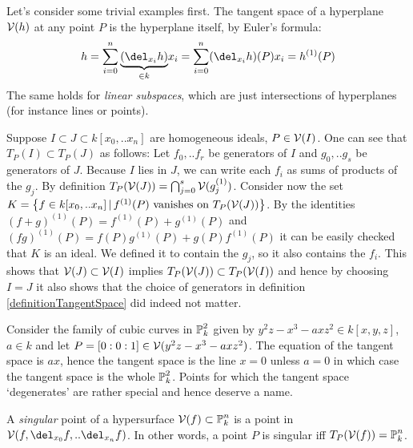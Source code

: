 \begin{example} \label{exampleTangentPlaneOfLinearSubsets}
Let's consider some trivial examples first.
The tangent space of a hyperplane $\operatorname{\mathcal V}(h)$ at any point $P$ is the hyperplane itself, by Euler's formula:
\begin{equation}
h = \sum_{i=0}^n \underset{\in k}{\underbrace{(\del_{x_i}h)}}x_i = \sum_{i=0}^n (\del_{x_i}h)(P) x_i = h^{(1)}(P)
\end{equation}
The same holds for \emph{linear subspaces}, which are just intersections of hyperplanes (for instance lines or points).
\end{example}

\begin{example}
Suppose $I \subset J \subset k[x_0,..x_n]$ are homogeneous ideals, $P \in \operatorname{\mathcal V}(I)$.
One can see that $T_P(I) \subset T_P(J)$ as follows: Let $f_0,..f_r$ be generators of $I$ and $g_0,..g_s$ be generators of $J$.
Because $I$ lies in $J$, we can write each $f_i$ as sums of products of the $g_j$.
By definition $T_P(\operatorname{\mathcal V}(J)) = \bigcap_{j=0}^s \operatorname{\mathcal V}(g_j^{(1)})$.
Consider now the set $K = \left\lbrace f \in k[x_0,..x_n] \,|\, f^{(1)}(P) \text{ vanishes on }T_P(\operatorname{\mathcal V}(J))\right\rbrace$.
By the identities $(f+g)^{(1)}(P) = f^{(1)}(P) + g^{(1)}(P)$ and $(fg)^{(1)}(P) = f(P)g^{(1)}(P) + g(P)f^{(1)}(P)$ it can be easily checked that $K$ is an ideal.
We defined it to contain the $g_j$, so it also contains the $f_i$.
This shows that $\operatorname{\mathcal V}(J) \subset \operatorname{\mathcal V}(I)$ implies $T_P(\operatorname{\mathcal V}(J)) \subset T_P(\operatorname{\mathcal V}(I))$ and hence by choosing $I=J$ it also shows that the choice of generators in definition \ref{definitionTangentSpace} did indeed not matter.
\end{example}

\begin{example}
Consider the family of cubic curves in $\operatorname{\mathbb P}^2_k$ given by $y^2z - x^3 - axz^2 \in k[x,y,z]$, $a \in k$ and let $P = [0:0:1] \in \operatorname{\mathcal V}(y^2z - x^3 - axz^2)$.
The equation of the tangent space is $ax$, hence the tangent space is the line $x = 0$ unless $a = 0$ in which case the tangent space is the whole $\operatorname{\mathbb P}^2_k$.
Points for which the tangent space `degenerates' are rather special and hence deserve a name.
\end{example}


\begin{definition}
A \emph{singular} point of a hypersurface $\operatorname{\mathcal V}(f) \subset \operatorname{\mathbb P}^n_k$ is a point in $\V(f,\del_{x_0}f,..\del_{x_n}f)$.
In other words, a point $P$ is singular iff $T_P(\operatorname{\mathcal V}(f)) = \operatorname{\mathbb P}^n_k$.
\end{definition}

